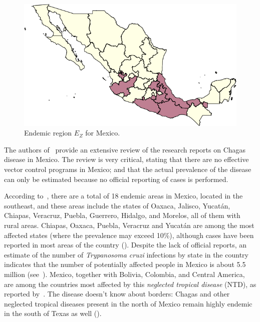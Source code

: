 \begin{figure}[ht]
\centering
\includegraphics[width=0.75\linewidth]
{figures/Ambientes_Gran_Chaco-Mexico1/Ambientes_Gran_Chaco-Mexico1.png}
\caption{Endemic region $E_Z$ for Mexico.}
\label{fig:endemic_zone_mexico}
\end{figure}


The authors of~\cite{carabarin2013chagas} provide an extensive review of the
research reports on Chagas disease in Mexico.
The review is very critical, stating that there are no effective vector control programs in Mexico;
and that the actual prevalence of the disease
can only be estimated because no official reporting of cases is performed.

According to~\cite{dumonteil1999update},
there are a total of 18 endemic areas in Mexico, located in the southeast, and
these areas include the states of Oaxaca, Jalisco, Yucatán, Chiapas, Veracruz,
Puebla, Guerrero, Hidalgo, and Morelos, all of them with rural areas.
Chiapas, Oaxaca, Puebla, Veracruz and Yucatán are among the most affected states (where the prevalence may exceed 10\%), although cases have been reported in most areas of the country (\cite{cruz2006chagmex,dumonteil1999update}).
Despite the lack of official reports, an estimate of the number of \textit{Trypanosoma cruzi} infections by state in the country
indicates that the number of potentially
affected people in Mexico is about 5.5 million (see~\cite{carabarin2013chagas}).
Mexico, together with Bolivia, Colombia, and Central
America, are among the countries most affected by this
\textit{neglected tropical disease} (NTD), as reported by~\cite{hotez2013innovation}.
The disease doesn't know about borders:
Chagas and other neglected tropical diseases present in the north of Mexico remain highly endemic in the south of Texas as well (\cite{hotez2012texas}).

